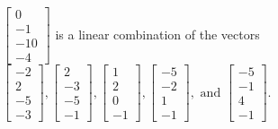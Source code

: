 \begin{exercise}
\begin{exerciseStatement}
  \end{exerciseStatement}
  \begin{exerciseAnswer}
   \(\left[\begin{array}{c}
0 \\
-1 \\
-10 \\
-4
\end{array}\right]\) 
  	 is  
	a linear combination of the vectors \(\left[\begin{array}{c}
-2 \\
2 \\
-5 \\
-3
\end{array}\right] , \left[\begin{array}{c}
2 \\
-3 \\
-5 \\
-1
\end{array}\right] , \left[\begin{array}{c}
1 \\
2 \\
0 \\
-1
\end{array}\right] , \left[\begin{array}{c}
-5 \\
-2 \\
1 \\
-1
\end{array}\right] , \text{ and } \left[\begin{array}{c}
-5 \\
-1 \\
4 \\
-1
\end{array}\right]\).

	
  


  \end{exerciseAnswer}
\end{exercise}